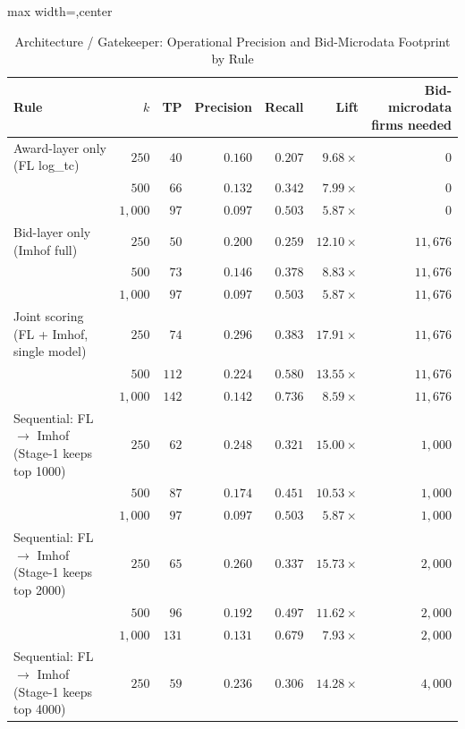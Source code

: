 \begin{table}[htbp]
\centering
\caption{Architecture / Gatekeeper: Operational Precision and Bid-Microdata Footprint by Rule}
\label{tab:architecture_gatekeeper}
\begin{adjustbox}{max width=\textwidth,center}
\begin{threeparttable}
\footnotesize
\begin{tabular}{lrrrrrr}
\toprule
Rule & $k$ & TP & Precision & Recall & Lift & Bid-microdata firms needed \\
\midrule
Award-layer only (FL log\_tc) & $250$ & $40$ & $0.160$ & $0.207$ & $9.68\times$ & $0$ \\
 & $500$ & $66$ & $0.132$ & $0.342$ & $7.99\times$ & $0$ \\
 & $1{,}000$ & $97$ & $0.097$ & $0.503$ & $5.87\times$ & $0$ \\
\midrule
Bid-layer only (Imhof full) & $250$ & $50$ & $0.200$ & $0.259$ & $12.10\times$ & $11{,}676$ \\
 & $500$ & $73$ & $0.146$ & $0.378$ & $8.83\times$ & $11{,}676$ \\
 & $1{,}000$ & $97$ & $0.097$ & $0.503$ & $5.87\times$ & $11{,}676$ \\
\midrule
Joint scoring (FL + Imhof, single model) & $250$ & $74$ & $0.296$ & $0.383$ & $17.91\times$ & $11{,}676$ \\
 & $500$ & $112$ & $0.224$ & $0.580$ & $13.55\times$ & $11{,}676$ \\
 & $1{,}000$ & $142$ & $0.142$ & $0.736$ & $8.59\times$ & $11{,}676$ \\
\midrule
Sequential: FL $\rightarrow$ Imhof (Stage-1 keeps top 1000) & $250$ & $62$ & $0.248$ & $0.321$ & $15.00\times$ & $1{,}000$ \\
 & $500$ & $87$ & $0.174$ & $0.451$ & $10.53\times$ & $1{,}000$ \\
 & $1{,}000$ & $97$ & $0.097$ & $0.503$ & $5.87\times$ & $1{,}000$ \\
\midrule
Sequential: FL $\rightarrow$ Imhof (Stage-1 keeps top 2000) & $250$ & $65$ & $0.260$ & $0.337$ & $15.73\times$ & $2{,}000$ \\
 & $500$ & $96$ & $0.192$ & $0.497$ & $11.62\times$ & $2{,}000$ \\
 & $1{,}000$ & $131$ & $0.131$ & $0.679$ & $7.93\times$ & $2{,}000$ \\
\midrule
Sequential: FL $\rightarrow$ Imhof (Stage-1 keeps top 4000) & $250$ & $59$ & $0.236$ & $0.306$ & $14.28\times$ & $4{,}000$ \\

\end{tabular}
\end{threeparttable}
\end{adjustbox}
\end{table}
